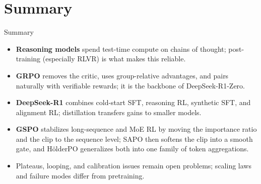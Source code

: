 \section{Summary}
\begin{frame}{Summary}
    \begin{itemize}\itemsep0.45em
      \item[\textcolor{red}{$\blacktriangleright$}] \textbf{Reasoning models} spend test-time compute on chains of thought; post-training (especially RLVR) is what makes this reliable.
      \item[\textcolor{red}{$\blacktriangleright$}] \textbf{GRPO} removes the critic, uses group-relative advantages, and pairs naturally with verifiable rewards; it is the backbone of DeepSeek-R1-Zero.
      \item[\textcolor{red}{$\blacktriangleright$}] \textbf{DeepSeek-R1} combines cold-start SFT, reasoning RL, synthetic SFT, and alignment RL; distillation transfers gains to smaller models.
      \item[\textcolor{red}{$\blacktriangleright$}] \textbf{GSPO} stabilizes long-sequence and MoE RL by moving the importance ratio and the clip to the sequence level; SAPO then softens the clip into a smooth gate, and H\"olderPO generalizes both into one family of token aggregations.
      \item[\textcolor{red}{$\blacktriangleright$}] Plateaus, looping, and calibration issues remain open problems; scaling laws and failure modes differ from pretraining.
    \end{itemize}
\end{frame}
